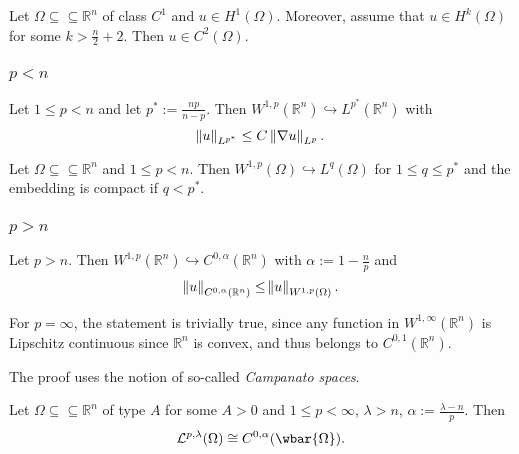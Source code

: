 \begin{corollary}
	Let $\Omega \subseteq \subseteq \mathbb{R}^n$ of class $C^1$ and $u \in H^1(\Omega)$. Moreover, assume that $u \in H^k(\Omega)$ for some $k > \frac{n}{2} + 2$. Then $u \in C^2(\Omega)$.
\end{corollary}

\subsubsection*{$p < n$}

\begin{theorem}
	Let $1 \leq p < n$ and let $p^* := \frac{np}{n - p}$. Then $W^{1,p}(\mathbb{R}^n) \hookrightarrow L^{p^*}(\mathbb{R}^n)$ with
	\begin{equation*}
		\norm{u}_{L^{p^*}} \leq C \norm[0]{\nabla u}_{L^p}.
	\end{equation*}
\end{theorem}

\begin{theorem}
	Let $\Omega \subseteq \subseteq \mathbb{R}^n$ and $1 \leq p < n$. Then $W^{1,p}(\Omega) \hookrightarrow L^q(\Omega)$ for $1 \leq q \leq p^*$ and the embedding is compact if $q < p^*$.
\end{theorem}

\subsubsection*{$p > n$}

\begin{theorem}
	Let $p > n$. Then $W^{1,p}(\mathbb{R}^n) \hookrightarrow C^{0,\alpha}(\mathbb{R}^n)$ with $\alpha := 1 - \frac{n}{p}$ and
	\begin{equation*}
		\norm[0]{u}_{C^{0,\alpha}(\mathbb{R}^n)} \leq \norm{u}_{W^{1,p}(\Omega)}.
	\end{equation*}
\end{theorem}

\begin{remark}
	For $p = \infty$, the statement is trivially true, since any function in $W^{1,\infty}(\mathbb{R}^n)$ is Lipschitz continuous since $\mathbb{R}^n$ is convex, and thus belongs to $C^{0,1}(\mathbb{R}^n)$.
\end{remark}

The proof uses the notion of so-called \emph{Campanato spaces}. 

\begin{theorem}
	Let $\Omega \subseteq \subseteq \mathbb{R}^n$ of type $A$ for some $A > 0$ and $1 \leq p < \infty$, $\lambda > n$, $\alpha := \frac{\lambda - n}{p}$. Then
	\begin{equation*}
		\mathcal{L}^{p,\lambda}(\Omega) \cong C^{0,\alpha}(\wbar{\Omega}).
	\end{equation*}
\end{theorem}

